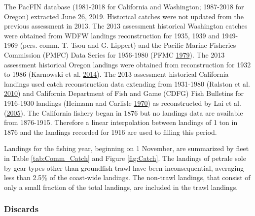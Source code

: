 \documentclass[12pt,]{article}
\begin{document}
The PacFIN database (1981-2018 for California and Washington; 1987-2018
for Oregon) extracted June 26, 2019. Historical catches were not updated
from the previous assessment in 2013. The 2013 assessment historical
Washington catches were obtained from WDFW landings reconstruction for
1935, 1939 and 1949- 1969 (pers. comm. T. Tsou and G. Lippert) and the
Pacific Marine Fisheries Commission (PMFC) Data Series for 1956-1980
(PFMC \protect\hyperlink{ref-pfmc_data_1979}{1979}). The 2013 assessment
historical Oregon landings were obtained from reconstruction for 1932 to
1986 (Karnowski et al.
\protect\hyperlink{ref-karnowski_historical_2014}{2014}). The 2013
assessment historical California landings used catch reconstruction data
extending from 1931-1980 (Ralston et al.
\protect\hyperlink{ref-ralston_documentation_2010}{2010}) and California
Department of Fish and Game (CDFG) Fish Bulletins for 1916-1930 landings
(Heimann and Carlisle
\protect\hyperlink{ref-heimann_pacific_1970}{1970}) as reconstructed by
Lai et al. (\protect\hyperlink{ref-lai_stock_2005}{2005}). The
California fishery began in 1876 but no landings data are available from
1876-1915. Therefore a linear interpolation between landings of 1 ton in
1876 and the landings recorded for 1916 are used to filling this period.

Landings for the fishing year, beginning on 1 November, are summarized
by fleet in Table \ref{tab:Comm_Catch} and Figure \ref{fig:Catch}. The
landings of petrale sole by gear types other than groundfish-trawl have
been inconsequential, averaging less than 2.5\% of the coast-wide
landings. The non-trawl landings, that consist of only a small fraction
of the total landings, are included in the trawl landings.

\subsubsection{Discards}\label{discards}
\end{document}
